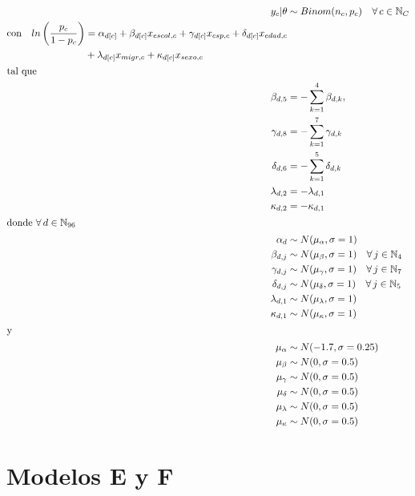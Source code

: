 \begin{align}\label{eq:Modelo_Comp_D}
y_c|\theta & \sim Binom(n_c,p_c) \quad \forall \, c \in \mathbb{N}_C \nonumber \\
\begin{split}
\text{con} \quad ln\left(\dfrac{p_c}{1-p_c}\right) &= \alpha_{d[c]} + \beta_{d[c]} x_{escol,c} + \gamma_{d[c]} x_{csp,c} + \delta_{d[c]} x_{edad,c} \\
&+ \lambda_{d[c]} x_{migr,c} + \kappa_{d[c]} x_{sexo,c} 
\end{split}\\
\intertext{tal que} 
\beta_{d,5} &= -\sum\limits_{k = 1}^{4} \beta_{d,k}, \nonumber \\
\gamma_{d,8} &= -\sum\limits_{k = 1}^{7} \gamma_{d,k} \nonumber \\
\delta_{d,6} &= -\sum\limits_{k = 1}^{5} \delta_{d,k} \nonumber \\
\lambda_{d,2} &= -\lambda_{d,1} \nonumber \\
\kappa_{d,2} &= -\kappa_{d,1} \nonumber \\
\intertext{donde $\forall \, d \in \mathbb{N}_{96}$}
\alpha_d & \sim N(\mu_{\alpha}, \sigma=1) \quad  \nonumber \\
\beta_{d,j} & \sim N(\mu_{\beta}, \sigma=1) \quad \forall \, j \in \mathbb{N}_{4} \nonumber \\
\gamma_{d,j} & \sim N(\mu_{\gamma}, \sigma=1) \quad \forall \, j \in \mathbb{N}_{7} \nonumber \\
\delta_{d,j} & \sim N(\mu_{\delta}, \sigma=1) \quad \forall \, j \in \mathbb{N}_{5} \nonumber \\
\lambda_{d,1} & \sim N(\mu_{\lambda}, \sigma=1) \nonumber \\
\kappa_{d,1} & \sim N(\mu_{\kappa}, \sigma=1) \nonumber \\
\intertext{y}
\mu_{\alpha} &\sim N(-1.7,\sigma=0.25) \nonumber \\
\mu_{\beta} &\sim N(0,\sigma=0.5) \nonumber \\
\mu_{\gamma} &\sim N(0,\sigma=0.5) \nonumber \\
\mu_{\delta} &\sim N(0,\sigma=0.5) \nonumber \\
\mu_{\lambda} &\sim N(0,\sigma=0.5) \nonumber \\
\mu_{\kappa} &\sim N(0,\sigma=0.5) \nonumber
\end{align}

\section{Modelos E y F}

